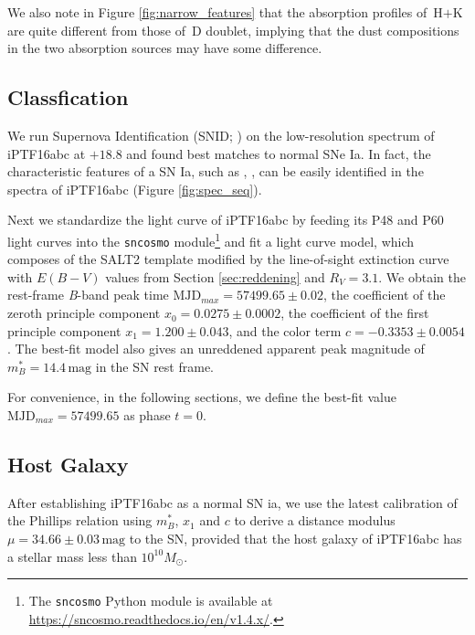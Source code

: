 \documentclass[twocolumn]{aastex61}
\newcommand{\sm}{M_\odot}
\begin{document}
We also note in Figure \ref{fig:narrow_features} that the absorption
profiles of \,H$+$K are quite different from those of \,D
doublet, implying that the dust compositions in the two absorption sources
may have some difference. 


\subsection{Classfication}
\label{sec:classification}

We run Supernova Identification (SNID; \citealt{2007ApJ...666.1024B})
on the low-resolution spectrum of iPTF16abc at $+18.8$ and found best
matches to normal SNe Ia. In fact, the characteristic features of a SN
Ia, such as , , can be easily identified in the
spectra of iPTF16abc (Figure \ref{fig:spec_seq}).

Next we standardize the light curve of iPTF16abc by feeding its P48
and P60 light curves into the \texttt{sncosmo} module\footnote{The
  \texttt{sncosmo} Python module is available at
  \url{https://sncosmo.readthedocs.io/en/v1.4.x/}.} and fit a light
curve model, which composes of the SALT2 template
\citep{2007A&A...466...11G} modified by the line-of-sight extinction
curve \citep{1999PASP..111...63F} with $E(B-V)$ values from Section
\ref{sec:reddening} and $R_V=3.1$. We obtain the rest-frame
\textit{B}-band peak time $\textrm{MJD}_{max}=57499.65\pm0.02$, the coefficient
of the zeroth principle component $x_0=0.0275\pm0.0002$, the
coefficient of the first principle component $x_1=1.200\pm0.043$, and
the color term $c=-0.3353\pm0.0054$. The best-fit model also gives an
unreddened apparent peak magnitude of $m^*_{B}=14.4\,\textrm{mag}$ in
the SN rest frame.

For convenience, in the following sections, we define the best-fit
value $\textrm{MJD}_{max}=57499.65$ as phase $t=0$.

\subsection{Host Galaxy}
\label{sec:host}

After establishing iPTF16abc as a normal SN ia, we use the latest
calibration \citep{2014A&A...568A..22B} of the Phillips relation
\citep{1993ApJ...413L.105P} using $m^*_{B}$, $x_1$ and $c$ to derive a
distance modulus $\mu=34.66\pm0.03\,\textrm{mag}$ to the SN, provided
that the host galaxy of iPTF16abc has a stellar mass less than
$10^{10}\sm$.
\end{document}
